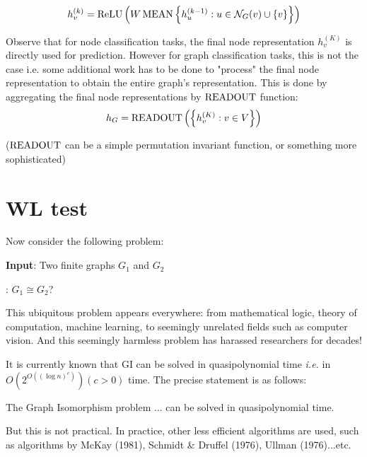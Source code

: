 \begin{architecture}
	$$h_v^{(k)} = \operatorname{ReLU} \left( W \operatorname{MEAN} \left\{ h_u^{(k - 1)} : u \in \mathcal{N}_G(v) \cup \{v\} \right\} \right)$$
\end{architecture}


Observe that for node classification tasks, the final node representation $h_v^{(K)}$ is directly used for prediction.
However for graph classification tasks, this is not the case i.e. some additional work has to be done to "process" the final node representation to obtain the entire graph's representation.
This is done by aggregating the final node representations by $\operatorname{READOUT}$ function:
	$$h_G = \operatorname{READOUT} \left( \left\{ h_v^{(K)} : v \in V \right\} \right)$$ 
	
($\operatorname{READOUT}$ can be a simple permutation invariant function, or something more sophisticated\cite{Ying2018}\cite{Zhang2018})


\section{WL test}

Now consider the following problem:

\begin{problem}
{\bf Input}:  Two finite graphs $G_1$ and $G_2$

: $G_1 \cong G_2$?
\end{problem}

This ubiquitous problem appears everywhere: from mathematical logic, theory of computation, machine learning, to seemingly unrelated fields such as computer vision.
And this seemingly harmless problem has harassed researchers for decades!


It is currently known that \textsc{GI} can be solved in quasipolynomial time {\it i.e.} in $O \left( 2^{O \left( \left( \log n \right)^c \right)} \right) (c > 0)$ time\cite{Babai2016}.
The precise statement is as follows:
	
\begin{theorem}[Babai, 2015]
The Graph Isomorphism problem ... can be solved in quasipolynomial time.
\end{theorem}

But this is not practical.
In practice, other less efficient algorithms are used, such as algorithms by McKay (1981), Schmidt \& Druffel (1976), Ullman (1976)...etc.


